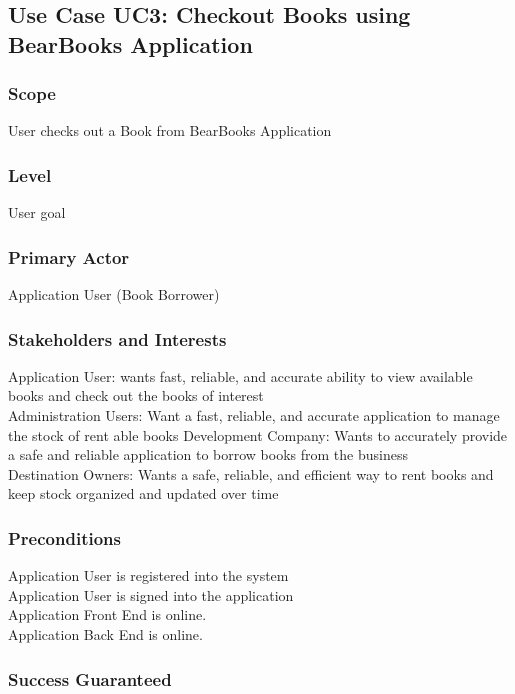 \documentclass{article}
\begin{document}
	
	\subsection{Use Case UC3: Checkout Books using BearBooks Application}
	
	\subsubsection{\textbf{Scope}} 
	User checks out a Book from BearBooks Application
	\subsubsection{\textbf{Level}} 
	User goal
	\subsubsection{\textbf{Primary Actor}} 
	Application User (Book Borrower)
	\subsubsection{\textbf{Stakeholders and Interests}}
	Application User: wants fast, reliable, and accurate ability to view available books and check out the books of interest \\
	Administration Users: Want a fast, reliable, and accurate application to manage the stock of rent able books
	Development Company: Wants to accurately provide a safe and reliable application to borrow books from the business \\
	Destination Owners: Wants a safe, reliable, and efficient way to rent books and keep stock organized and updated over time \\
	\subsubsection{\textbf{Preconditions}}
	Application User is registered into the system \\
	Application User is signed into the application \\
	Application Front End is online. \\
	Application Back End is online. \\
	
	\subsubsection{\textbf{Success Guaranteed}}
	
\end{document}
